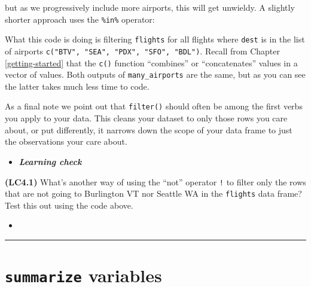 \documentclass[12pt, krantz2,]{krantz}
\makeatletter
\newenvironment{Shaded}{\begin{snugshade}}{\end{snugshade}}
\newcommand{\KeywordTok}[1]{\textcolor[rgb]{0.27,0.27,0.27}{\textbf{#1}}}
\newcommand{\NormalTok}[1]{#1}
\newcommand{\OperatorTok}[1]{\textcolor[rgb]{0.43,0.43,0.43}{\textbf{#1}}}
\newcommand{\StringTok}[1]{\textcolor[rgb]{0.5,0.5,0.5}{#1}}
\newenvironment{kframe}{%
\medskip{}
\setlength{\fboxsep}{.8em}
 \def\at@end@of@kframe{}%
 \ifinner\ifhmode%
  \def\at@end@of@kframe{\end{minipage}}%
  \begin{minipage}{\columnwidth}%
 \fi\fi%
 \def\FrameCommand##1{\hskip\@totalleftmargin \hskip-\fboxsep
 \colorbox{shadecolor}{##1}\hskip-\fboxsep
     \hskip-\linewidth \hskip-\@totalleftmargin \hskip\columnwidth}%
 \MakeFramed {\advance\hsize-\width
   \@totalleftmargin\z@ \linewidth\hsize
   \@setminipage}}%
 {\par\unskip\endMakeFramed%
 \at@end@of@kframe}
\renewenvironment{Shaded}{\begin{kframe}}{\end{kframe}}
\newenvironment{rmdblock}[1]
  {\begin{shaded*}
  \begin{itemize}
  \renewcommand{\labelitemi}{
    \raisebox{-.7\height}[0pt][0pt]{
    }
  }
  \item
  }
  {
  \end{itemize}
  \end{shaded*}
  }
\newenvironment{learncheck}
  {\begin{rmdblock}{warning}}
  {\end{rmdblock}}
\makeatother
\begin{document}
but as we progressively include more airports, this will get unwieldy. A slightly shorter approach uses the \texttt{\%in\%} operator:

\begin{Shaded}
\end{Shaded}

What this code is doing is filtering \texttt{flights} for all flights where \texttt{dest} is in the list of airports \texttt{c("BTV",\ "SEA",\ "PDX",\ "SFO",\ "BDL")}. Recall from Chapter \ref{getting-started} that the \texttt{c()} function ``combines'' or ``concatenates'' values in a vector of values. Both outputs of \texttt{many\_airports} are the same, but as you can see the latter takes much less time to code.

As a final note we point out that \texttt{filter()} should often be among the first verbs you apply to your data. This cleans your dataset to only those rows you care about, or put differently, it narrows down the scope of your data frame to just the observations your care about.

\begin{learncheck}
\textbf{\emph{Learning check}}
\end{learncheck}

\textbf{(LC4.1)} What's another way of using the ``not'' operator \texttt{!} to filter only the rows that are not going to Burlington VT nor Seattle WA in the \texttt{flights} data frame? Test this out using the code above.

\begin{learncheck}

\end{learncheck}

\begin{center}\rule{0.5\linewidth}{\linethickness}\end{center}

\hypertarget{summarize}{%
\section{\texorpdfstring{\texttt{summarize} variables}{summarize variables}}\label{summarize}}
\end{document}
